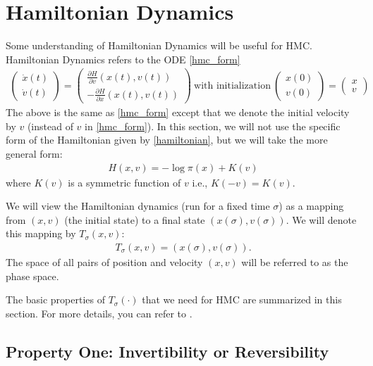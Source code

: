 \documentclass{scrartcl}
\begin{document}
\section{Hamiltonian Dynamics}
Some understanding of Hamiltonian Dynamics will be useful for
HMC. Hamiltonian Dynamics refers to the ODE \eqref{hmc_form}
\begin{align}
  \label{hmc_dyn}
      \begin{pmatrix}
    \dot{x}(t) \\ \dot{v}(t)
  \end{pmatrix} =
  \begin{pmatrix}
    \frac{\partial H}{\partial v}(x(t), v(t)) \\ -\frac{\partial
    H}{\partial x}(x(t), v(t))
  \end{pmatrix} ~\text{with initialization}~
  \begin{pmatrix}
    x(0) \\ v(0)
  \end{pmatrix} =
  \begin{pmatrix}
    x \\ v
  \end{pmatrix}
\end{align}
The above is the same as \eqref{hmc_form} except that we denote the
initial velocity by $v$ (instead of $v$ in \eqref{hmc_form}). In this
section, we will not use the specific form of the Hamiltonian given by
\eqref{hamiltonian}, but we will take the more general form:
\begin{align}\label{Hgen}
  H(x, v) = -\log \pi(x) + K(v)
\end{align}
where $K(v)$ is a symmetric function of $v$ i.e., $K(-v) = K(v)$. 

We will view the Hamiltonian dynamics (run for a fixed time $\sigma$)
as a mapping from $(x, v)$ (the initial state) to a final state
$(x(\sigma), v(\sigma))$. We will denote this mapping by
$T_{\sigma}(x, v)$:
\begin{align*}
  T_{\sigma}(x, v) = (x(\sigma), v(\sigma)). 
\end{align*}
The space of all pairs of position and velocity $(x, v)$ will be
referred to as the phase space. 

The basic properties of $T_{\sigma}(\cdot)$ that we need for HMC are
summarized in this section. For more details, you can refer to
\citet{neal2011mcmc}. 

\subsection{Property One: Invertibility or Reversibility}
\end{document}
